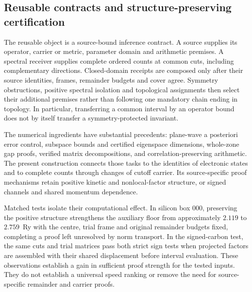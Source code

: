 \subsection*{Reusable contracts and structure-preserving certification}
The reusable object is a source-bound inference contract. A source supplies its
operator, carrier or metric, parameter domain and arithmetic premises. A spectral
receiver supplies complete ordered counts at common cuts, including complementary
directions. Closed-domain receipts are composed only after their source identities,
frames, remainder budgets and cover agree. Symmetry obstructions, positive spectral
isolation and topological assignments then select their additional premises rather
than following one mandatory chain ending in topology. In particular, transferring
a common interval by an operator bound does not by itself transfer a
symmetry-protected invariant.

The numerical ingredients have substantial precedents: plane-wave a posteriori
error control\cite{herbstNonscf,practicalPWBounds}, subspace bounds and certified
eigenspace dimensions\cite{sirkovicSubspace,certifiedMOR}, whole-zone gap
proofs\cite{hoangPhotonic}, verified matrix
decompositions\cite{rumpDecompositions}, and correlation-preserving
arithmetic\cite{affineArithmetic}. The present construction connects those tasks
to the identities of electronic states and to complete counts through changes of
cutoff carrier. Its source-specific proof mechanisms retain positive kinetic and
nonlocal-factor structure, or signed channels and shared momentum dependence.

Matched tests isolate their computational effect. In silicon box 000, preserving
the positive structure strengthens the auxiliary floor from approximately
$2.119$ to $2.759$~Ry with the centre, trial frame and original remainder budgets
fixed, completing a proof left unresolved by norm transport. In the signed-carbon
test, the same cuts and trial matrices pass both strict sign tests when projected
factors are assembled with their shared displacement before interval evaluation.
These observations establish a gain in sufficient proof strength for the tested
inputs. They do not establish a universal speed ranking or remove the need for
source-specific remainder and carrier proofs.
